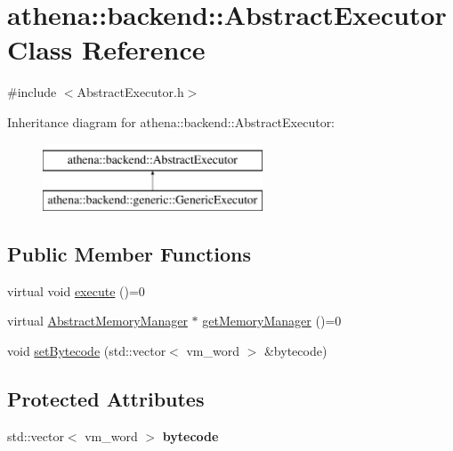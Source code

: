 \hypertarget{classathena_1_1backend_1_1_abstract_executor}{}\section{athena\+:\+:backend\+:\+:Abstract\+Executor Class Reference}
\label{classathena_1_1backend_1_1_abstract_executor}


{\ttfamily \#include $<$Abstract\+Executor.\+h$>$}

Inheritance diagram for athena\+:\+:backend\+:\+:Abstract\+Executor\+:\begin{figure}[H]
\begin{center}
\leavevmode
\includegraphics[height=2.000000cm]{classathena_1_1backend_1_1_abstract_executor}
\end{center}
\end{figure}
\subsection*{Public Member Functions}
\begin{DoxyCompactItemize}
\item 
virtual void \mbox{\hyperlink{classathena_1_1backend_1_1_abstract_executor_a5f179146ae76002b678a4862553f87ce}{execute}} ()=0
\item 
virtual \mbox{\hyperlink{classathena_1_1backend_1_1_abstract_memory_manager}{Abstract\+Memory\+Manager}} $\ast$ \mbox{\hyperlink{classathena_1_1backend_1_1_abstract_executor_a6d61486e2a06500c9c0aa1e03a475e4a}{get\+Memory\+Manager}} ()=0
\item 
void \mbox{\hyperlink{classathena_1_1backend_1_1_abstract_executor_afa06d9875ee6c53986873f29db380893}{set\+Bytecode}} (std\+::vector$<$ vm\+\_\+word $>$ \&bytecode)
\end{DoxyCompactItemize}
\subsection*{Protected Attributes}
\begin{DoxyCompactItemize}
\item 
\mbox{\label{classathena_1_1backend_1_1_abstract_executor_a948d95ced27de4fb3445ef341a4b9035}} 
std\+::vector$<$ vm\+\_\+word $>$ {\bfseries bytecode}
\end{DoxyCompactItemize}


